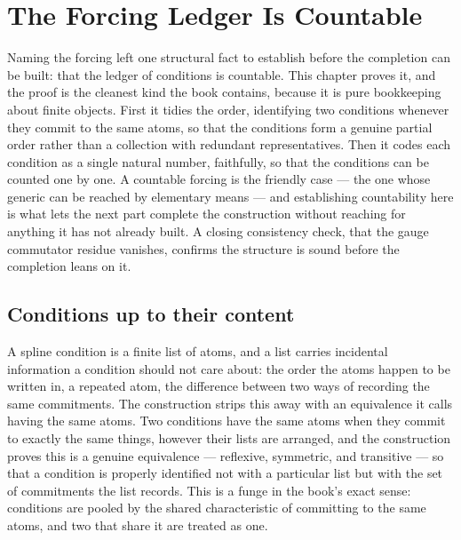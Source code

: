 \chapter{The Forcing Ledger Is Countable}
\label{chap:forcing-ledger-countable}

Naming the forcing left one structural fact to establish before the completion can be built: that the
ledger of conditions is countable. This chapter proves it, and the proof is the cleanest kind the book
contains, because it is pure bookkeeping about finite objects. First it tidies the order, identifying two
conditions whenever they commit to the same atoms, so that the conditions form a genuine partial order
rather than a collection with redundant representatives. Then it codes each condition as a single natural
number, faithfully, so that the conditions can be counted one by one. A countable forcing is the friendly
case --- the one whose generic can be reached by elementary means --- and establishing countability here
is what lets the next part complete the construction without reaching for anything it has not already
built. A closing consistency check, that the gauge commutator residue vanishes, confirms the structure is
sound before the completion leans on it.

\section{Conditions up to their content}
\label{se:conditions-up-to-their-content}

A spline condition is a finite list of atoms, and a list carries incidental information a condition
should not care about: the order the atoms happen to be written in, a repeated atom, the difference
between two ways of recording the same commitments. The construction strips this away with an equivalence
it calls having the same atoms. Two conditions have the same atoms when they commit to exactly the same
things, however their lists are arranged, and the construction proves this is a genuine equivalence ---
reflexive, symmetric, and transitive --- so that a condition is properly identified not with a particular
list but with the set of commitments the list records. This is a funge in the book's exact sense:
conditions are pooled by the shared characteristic of committing to the same atoms, and two that share it
are treated as one.

